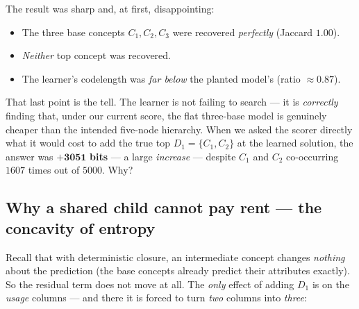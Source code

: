\documentclass[11pt]{article}
\begin{document}
The result was sharp and, at first, disappointing:
\begin{itemize}
  \item The three base concepts $C_1,C_2,C_3$ were recovered \emph{perfectly}
        (Jaccard $1.00$).
  \item \emph{Neither} top concept was recovered.
  \item The learner's codelength was \emph{far below} the planted model's
        (ratio $\approx 0.87$).
\end{itemize}
That last point is the tell. The learner is not failing to search --- it is
\emph{correctly} finding that, under our current score, the flat three-base model
is genuinely cheaper than the intended five-node hierarchy. When we asked the
scorer directly what it would cost to add the true top $D_1=\{C_1,C_2\}$ at the
learned solution, the answer was $\mathbf{+3051}$ \textbf{bits} --- a large
\emph{increase} --- despite $C_1$ and $C_2$ co-occurring $1607$ times out of
$5000$. Why?

\subsection{Why a shared child cannot pay rent --- the concavity of entropy}

Recall that with deterministic closure, an intermediate concept changes
\emph{nothing} about the prediction (the base concepts already predict their
attributes exactly). So the residual term does not move at all. The \emph{only}
effect of adding $D_1$ is on the \emph{usage} columns --- and there it is forced
to turn \emph{two} columns into \emph{three}:
\end{document}
